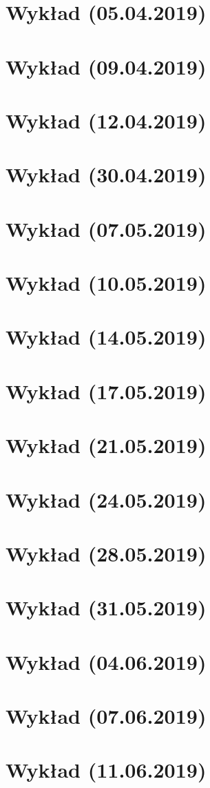 \documentclass{article}
\begin{document}
\section{Wykład (05.04.2019)}

\pagebreak
\section{Wykład (09.04.2019)}

\pagebreak
\section{Wykład (12.04.2019)}

\pagebreak
\section{Wykład (30.04.2019)}

\pagebreak
\section{Wykład (07.05.2019)}

\pagebreak
\section{Wykład (10.05.2019)}

\pagebreak
\section{Wykład (14.05.2019)}

\pagebreak
\section{Wykład (17.05.2019)}

\pagebreak
\section{Wykład (21.05.2019)}

\pagebreak
\section{Wykład (24.05.2019)}

\pagebreak
\section{Wykład (28.05.2019)}

\pagebreak
\section{Wykład (31.05.2019)}

\pagebreak
\section{Wykład (04.06.2019)}

\pagebreak
\section{Wykład (07.06.2019)}

\pagebreak
\section{Wykład (11.06.2019)}

\end{document}

